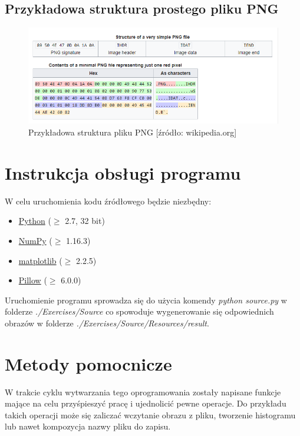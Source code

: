 \documentclass[a4paper,12pt]{book}
\begin{document}
\subsection*{Przykładowa struktura prostego pliku PNG}
\begin{figure}[H]
	\includegraphics[width=1\textwidth]{./overview/examplePNG.png}
	\caption{Przykładowa struktura pliku PNG [źródło: wikipedia.org]}
\end{figure}

\section{Instrukcja obsługi programu}
W celu uruchomienia kodu źródłowego będzie niezbędny: 
\begin{itemize}
	\item \href{https://www.python.org/}{Python} ($\geq$ 2.7, 32 bit)
	\item \href{https://numpy.org/}{NumPy} ($\geq$ 1.16.3)
	\item \href{https://matplotlib.org/}{matplotlib} ($\geq$ 2.2.5)
	\item \href{https://pillow.readthedocs.io/en/stable/}{Pillow} ($\geq$ 6.0.0)
\end{itemize}
Uruchomienie programu sprowadza się do użycia komendy \textit{python source.py} w folderze \textit{./Exercises/Source} co spowoduje wygenerowanie się odpowiednich obrazów w folderze \textit{./Exercises/Source/Resources/result}. 

\section{Metody pomocnicze}
W trakcie cyklu wytwarzania tego oprogramowania zostały napisane funkcje mające na celu przyśpieszyć pracę i ujednolicić pewne operacje. Do przykładu takich operacji może się zaliczać wczytanie obrazu z pliku, tworzenie histogramu lub nawet kompozycja nazwy pliku do zapisu. 
\end{document}
